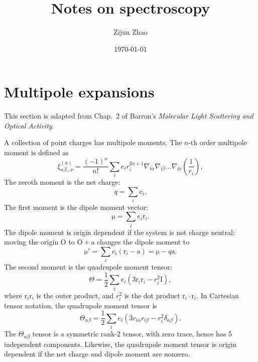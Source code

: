 \documentclass[amsmath,amssymb,notitlepage,11pt,reprint,aip]{revtex4-1}
\newcommand{\bvec}[1]{\bm{\mathrm{#1}}}
\begin{document}

\title{Notes on spectroscopy}

\author{Zijun Zhao}

\date{\today}


\maketitle
\section{Multipole expansions}
This section is adapted from Chap.~2 of Barron's \textit{Molecular Light Scattering and Optical Activity}.\cite{barron.2004.10.1017/CBO9780511535468}

A collection of point charges has multipole moments.
The $n$-th order multipole moment is defined as
\begin{equation}
    \xi_{\alpha\beta\dots\nu}^{(n)}=\frac{(-1)^n}{n!}\sum_{i}e_ir_i^{2n+1}\nabla_{i\alpha}\nabla_{i\beta}\dots\nabla_{i\nu}\left(\frac{1}{r_i}\right),
\end{equation}
The zeroth moment is the net charge:
\begin{equation}
    q = \sum_ie_i.
\end{equation}
The first moment is the dipole moment vector:
\begin{equation}
    \bvec{\mu} = \sum_ie_i\bvec{r}_i.
\end{equation}
The dipole moment is origin dependent if the system is not charge neutral: moving the origin $\bvec{O}$ to $\bvec{O}+\bvec{a}$ changes the dipole moment to
\begin{equation}
    \bvec{\mu}' = \sum_ie_i(\bvec{r}_i-\bvec{a}) = \bvec{\mu} - q\bvec{a}.
\end{equation}
The second moment is the quadrupole moment tensor:
\begin{equation}
    \Theta=\frac{1}{2}\sum_ie_i\left(3\bvec{r}_i\bvec{r}_i-r_i^2\bvec{I}\right),
\end{equation}
where $\bvec{r}_i\bvec{r}_i$ is the outer product, and $r_i^2$ is the dot product $\bvec{r}_i\cdot\bvec{r}_i$.
In Cartesian tensor notation, the quadrupole moment tensor is
\begin{equation}
    \Theta_{\alpha\beta}=\frac{1}{2}\sum_ie_i\left(3r_{i\alpha}r_{i\beta}-r_i^2\delta_{\alpha\beta}\right).
\end{equation}
The $\Theta_{\alpha\beta}$ tensor is a symmetric rank-2 tensor, with zero trace, hence has 5 independent components.
Likewise, the quadrupole moment tensor is origin dependent if the net charge and dipole moment are nonzero.
\end{document}

